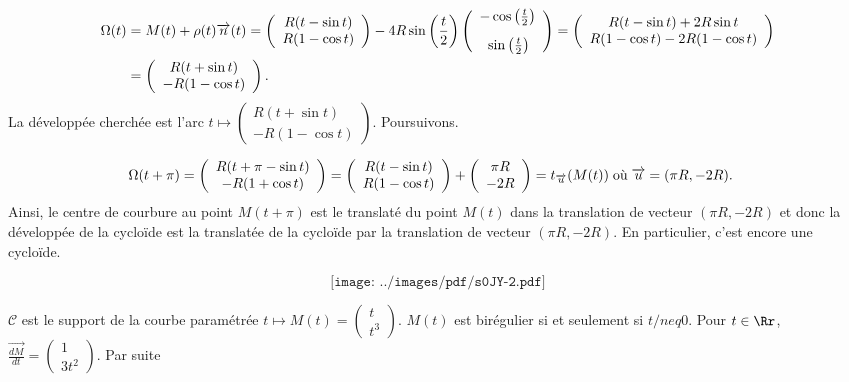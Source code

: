 {\begin{enumerate}
{\begin{align*}\ensuremath
\Omega(t)&=M(t)+\rho(t)\overrightarrow{n}(t)=\left(
\begin{array}{c}
R(t-\sin t)\\
R(1-\cos t)
\end{array}
\right)-4R\sin\left(\frac{t}{2}\right)\left(
\begin{array}{c}
-\cos\left(\frac{t}{2}\right)\\
\rule{0mm}{6mm}\sin\left(\frac{t}{2}\right)
\end{array}
\right)=\left(
\begin{array}{c}
R(t-\sin t)+2R\sin t\\
R(1-\cos t)-2R(1-\cos t)
\end{array}
\right)\\
 &=\left(
\begin{array}{c}
R(t+\sin t)\\
-R(1-\cos t)
\end{array}
\right).
\end{align*}
La développée cherchée est l'arc $t\mapsto\left(
\begin{array}{c}
R(t+\sin t)\\
-R(1-\cos t)
\end{array}
\right)$. Poursuivons.

\begin{align*}\ensuremath
\Omega(t+\pi)&=\left(
\begin{array}{c}
R(t+\pi-\sin t)\\
-R(1+\cos t)
\end{array}
\right)=\left(
\begin{array}{c}
R(t-\sin t)\\
R(1-\cos t)
\end{array}
\right)+\left(
\begin{array}{c}
\pi R\\
-2R
\end{array}
\right)=t_{\overrightarrow{u}}(M(t))\;\text{où}\;\overrightarrow{u}=(\pi R,-2R).
\end{align*}
Ainsi, le centre de courbure au point $M(t+\pi)$ est le translaté du point $M(t)$ dans la translation de vecteur $(\pi R,-2R)$ et donc la développée de la cycloïde est la translatée de la cycloïde par la translation de vecteur $(\pi R,-2R)$. En particulier, c'est encore une cycloïde.

$$\texttt{[image: ../images/pdf/s0JY-2.pdf]}$$

 \item  $\mathcal{C}$ est le support de la courbe paramétrée $t\mapsto M(t)=\left(
\begin{array}{c}
t\\
t^3
\end{array}
\right)$. $M(t)$ est birégulier si et seulement si $t/neq0$. Pour $t\in\Rr$, $\overrightarrow{\frac{dM}{dt}}=\left(
\begin{array}{c}
1\\
3t^2
\end{array}
\right)$. Par suite 

}
\end{enumerate}}
